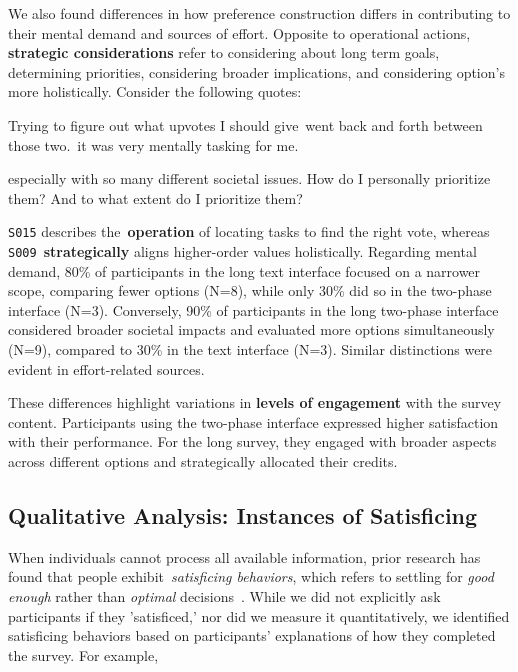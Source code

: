 We also found differences in how preference construction differs in contributing to their mental demand and sources of effort. Opposite to operational actions, \textbf{strategic considerations} refer to considering about long term goals, determining priorities, considering broader implications, and considering option's more holistically. Consider the following quotes:

\begin{displayquote}
Trying to figure out what upvotes I should give~\bracketellipsis went back and forth between those two.~\bracketellipsis it was very mentally tasking for me. \hfill {}
\end{displayquote}

\begin{displayquote}
\bracketellipsis especially with so many different societal issues. How do I personally prioritize them? And to what extent do I prioritize them? \hfill {}
\end{displayquote}

\texttt{S015} describes the~\textbf{operation} of locating tasks to find the right vote, whereas \texttt{S009}~\textbf{strategically} aligns higher-order values holistically. Regarding mental demand, 80\% of participants in the long text interface focused on a narrower scope, comparing fewer options (N=8), while only 30\% did so in the two-phase interface (N=3). Conversely, 90\% of participants in the long two-phase interface considered broader societal impacts and evaluated more options simultaneously (N=9), compared to 30\% in the text interface (N=3). Similar distinctions were evident in effort-related sources.

These differences highlight variations in \textbf{levels of engagement} with the survey content. Participants using the two-phase interface expressed higher satisfaction with their performance. For the long survey, they engaged with broader aspects across different options and strategically allocated their credits.

\subsection{Qualitative Analysis: Instances of Satisficing}
\label{sec:satisficing}
When individuals cannot process all available information, prior research has found that people exhibit~\textit{satisficing behaviors}, which refers to settling for \textit{good enough} rather than \textit{optimal} decisions~\cite{gigerenzerReasoningFastFrugal1996}. While we did not explicitly ask participants if they 'satisficed,' nor did we measure it quantitatively, we identified satisficing behaviors based on participants' explanations of how they completed the survey. For example, 

